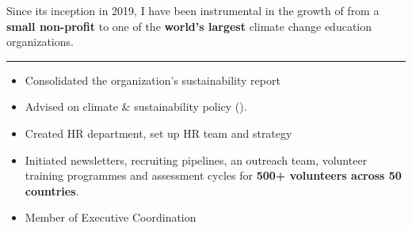 \documentclass[11pt,a4paper,ragged2e,withhyper]{altacv}
\begin{document}
\begin{paracol}{2}


\small{Since its inception in 2019, I have been instrumental in the growth of  from a \textbf{small non-profit} to one of the \textbf{world's largest} climate change education organizations.}

\vspace{-0.5em}
\rule{\linewidth}{0.5pt}\par
\medskip\medskip

\begin{itemize}
    \item Consolidated the organization's sustainability report
    \item Advised on climate \& sustainability policy ().
\end{itemize}



\medskip\medskip

\begin{itemize}
    \item Created HR department, set up HR team and strategy
    \item Initiated newsletters, recruiting pipelines, an outreach team, volunteer training programmes and assessment cycles for \textbf{500+ volunteers across 50 countries}.
    \item Member of Executive Coordination
\end{itemize}

\medskip


\end{paracol}
\end{document}
